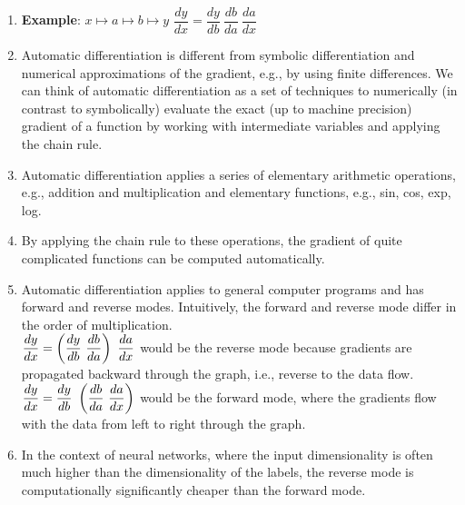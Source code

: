 \begin{enumerate}
    \item[] \textbf{Example}: $x \mapsto a \mapsto b \mapsto y$
    \hspace{1cm}
    $
        \dfrac{dy}{dx} = \dfrac{dy}{db}\ \dfrac{db}{da}\ \dfrac{da}{dx}
    $
    \hfill \cite{mfml/book/mml/Deisenroth-Faisal-Ong}

    \item 
    \begin{definition}
        Automatic differentiation is different from symbolic differentiation and numerical approximations of the gradient, e.g., by using finite differences.
        We can think of automatic differentiation as a set of techniques to numerically (in contrast to symbolically) evaluate the exact (up to machine precision) gradient of a function by working with intermediate variables and applying the chain rule.
        \hfill \cite{mfml/book/mml/Deisenroth-Faisal-Ong}
    \end{definition}


    \item Automatic differentiation applies a series of elementary arithmetic operations, e.g., addition and multiplication and elementary functions, e.g., sin, cos, exp, log. 
    \hfill \cite{mfml/book/mml/Deisenroth-Faisal-Ong}
    
    \item By applying the chain rule to these operations, the gradient of quite complicated functions can be computed automatically.
    \hfill \cite{mfml/book/mml/Deisenroth-Faisal-Ong}

    \item Automatic differentiation applies to general computer programs and has forward and reverse modes.
    Intuitively, the forward and reverse mode differ in the order of multiplication.
    \\
    $\dfrac{dy}{dx} = \dParenBrac{\dfrac{dy}{db}\ \dfrac{db}{da}}\ \dfrac{da}{dx}$ would be the reverse mode because gradients are propagated backward through the graph, i.e., reverse to the data flow.
    $\dfrac{dy}{dx} = \dfrac{dy}{db}\ \left(\dfrac{db}{da}\ \dfrac{da}{dx}\right)$ would be the forward mode, where the gradients flow with the data from left to right through the graph.
    
    \item In the context of neural networks, where the input dimensionality is often much higher than the dimensionality of the labels, the reverse mode is computationally significantly cheaper than the forward mode.
    \hfill \cite{mfml/book/mml/Deisenroth-Faisal-Ong}


\end{enumerate}

